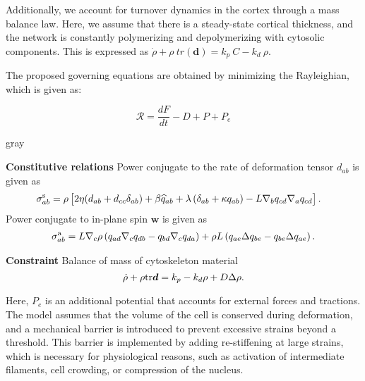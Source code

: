 Additionally, we account for turnover dynamics in the cortex through a
mass balance law. Here, we assume that there is a steady-state cortical
thickness, and the network is constantly polymerizing and depolymerizing
with cytosolic components. This is expressed as
\(\dot{\rho} + \rho \ tr(\mathbf{d}) = k_p\ C - k_d\ \rho\).

The proposed governing equations are obtained by minimizing the
Rayleighian, which is given as:

\[ \mathcal{R} = \frac{dF}{dt} - D + P + P_e \]


\begin{center}
	\begin{mybox}{gray}{  }
		
		\textbf{Constitutive relations}
		\newline
		Power conjugate to the rate of deformation tensor $d_{ab}$ is given as
		\begin{align}  \label{eq_box_A_2}
			& \sigma^{\rm s}_{ab} = \rho \left[2\eta  (d_{ab}+d_{cc} \delta_{ab}) + \beta  \widehat{q}_{ab}  + \lambda \left(\delta_{ab} + \kappa q_{ab}\right) -L\nabla_b q_{cd} \nabla_a q_{cd}\right].
		\end{align}
		Power conjugate to in-plane spin $\bm{w}$ is given as
		\begin{align}  
			\sigma^{\rm a}_{ab} = L \nabla_c \rho \left( q_{ad} \nabla_c q_{db}  - q_{bd} \nabla_c q_{da}  \right) + \rho L  \left(q_{ae}\Delta q_{be}  -q_{be}  \Delta q_{ae}  \right).
		\end{align}
		
		
		\textbf{Constraint}
		\newline
		Balance of mass of cytoskeleton material
		\begin{equation} 
			\dot{\rho} + \rho {\rm tr} \bm{d} = k_p - k_d \rho + D \Delta \rho.
		\end{equation}
		
	\end{mybox} 
\end{center}


Here, \(P_e\) is an additional potential that accounts for external
forces and tractions. The model assumes that the volume of the cell is
conserved during deformation, and a mechanical barrier is introduced to
prevent excessive strains beyond a threshold. This barrier is
implemented by adding re-stiffening at large strains, which is necessary
for physiological reasons, such as activation of intermediate filaments,
cell crowding, or compression of the nucleus.

